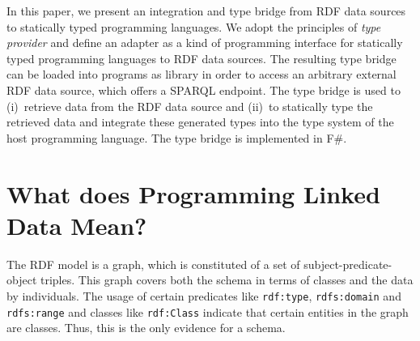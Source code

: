 \documentclass{llncs} %
\newcommand{\fs}{\textsf{F\#}\xspace}
\begin{document}
%
%
%
%

In this paper, we present an integration and type bridge from RDF data sources to
statically typed programming languages. We adopt the principles of \emph{type provider}
and define an adapter as a kind of programming interface
for statically typed programming languages to RDF data sources.
The resulting type bridge can be loaded into
programs as library in order to access an arbitrary external RDF data source,
which offers a SPARQL endpoint. The type bridge is used to (i)~retrieve data
from the RDF data source and (ii)~to statically type the retrieved data
and integrate these generated types into the type system of the host programming language.
The type bridge is implemented in \fs.

\section{What does Programming Linked Data Mean?}
\label{sec:context}


The RDF  model is  a graph, which is constituted of a set of subject-predicate-object triples.
This graph covers both the schema in terms of classes and the data by individuals.
The usage of certain predicates like \texttt{rdf:type}, \texttt{rdfs:domain} and \texttt{rdfs:range}
and classes like \texttt{rdf:Class} indicate that certain entities in the graph are classes.
Thus, this is the only evidence for a schema.
\end{document}

